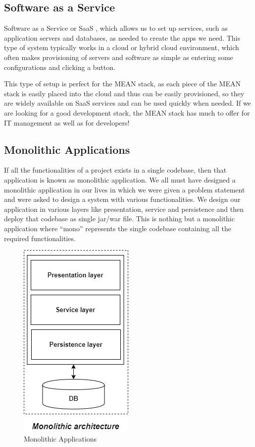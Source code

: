 \subsection{Software as a Service}
Software as a Service or SaaS , which allows us to set up services, such as application servers and databases, as needed to create the apps we need. This type of system typically works in a cloud or hybrid cloud environment, which often makes provisioning of servers and software as simple as entering some configurations and clicking a button.

This type of setup is perfect for the MEAN stack, as each piece of the MEAN stack is easily placed into the cloud and thus can be easily provisioned, so they are widely available on SaaS services and can be used quickly when needed. If we are looking for a good development stack, the MEAN stack has much to offer for IT management as well as for developers!

\subsection{Monolithic Applications}

If all the functionalities of a project exists in a single codebase, then that application is known as monolithic application. We all must have designed a monolithic application in our lives in which we were given a problem statement and were asked to design a system with various functionalities. We design our application in various layers like presentation, service and persistence and then deploy that codebase as single jar/war file. This is nothing but a monolithic application where “mono” represents the single codebase containing all the required functionalities.
\begin{figure}[!ht]
      \center
      \includegraphics[scale=0.60]{assets/monolithic.jpg}
      \caption{Monolithic Applications}
      \label{fig:monoapp}
\end{figure}

